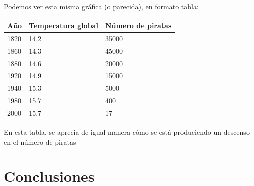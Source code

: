 \documentclass{article}
\begin{document}
Podemos ver esta misma gráfica (o parecida), en formato tabla:

\begin{table}[h]
\centering
\begin{tabular}{|l|l|l|}
\hline
\multicolumn{1}{|c|}{\textbf{Año}} & \multicolumn{1}{c|}{\textbf{Temperatura global}} & \multicolumn{1}{c|}{\textbf{Número de piratas}} \\ \hline
1820                               & 14.2                                             & 35000                                           \\ \hline
1860                               & 14.3                                             & 45000                                           \\ \hline
1880                               & 14.6                                             & 20000                                           \\ \hline
1920                               & 14.9                                             & 15000                                           \\ \hline
1940                               & 15.3                                             & 5000                                            \\ \hline
1980                               & 15.7                                             & 400                                             \\ \hline
2000                               & 15.7                                             & 17                                              \\ \hline
\end{tabular}
\end{table}

En esta tabla, se aprecia de igual manera cómo se está produciendo un descenso en el número de piratas

\section{Conclusiones}

{}

\end{document}
